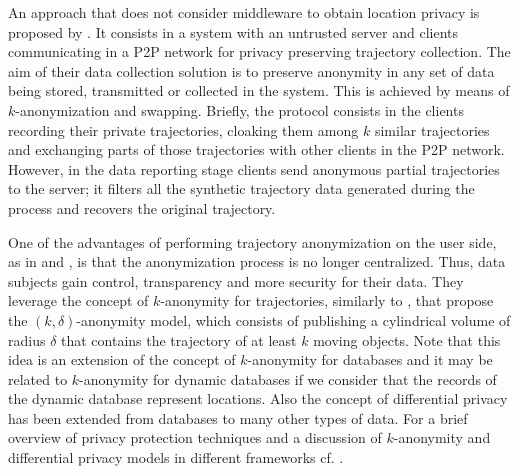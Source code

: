 \documentclass[times,twocolumn,final,authoryear]{elsarticle}
\begin{document}
An approach that does not consider middleware to obtain location privacy is proposed by \citet[Chapter 9]{Gidofalvi2007}. It consists in a system with an untrusted server and clients communicating in a P2P network for privacy preserving trajectory collection.
The aim of their data collection solution is to preserve anonymity in any set of data being stored, transmitted or
collected in the system. This is achieved by means of $k$-anonymization and swapping.
Briefly, the protocol consists in the clients recording their private trajectories, cloaking them among $k$ similar trajectories and exchanging parts of those trajectories with other clients in the P2P network. However, in the data reporting stage clients send anonymous partial trajectories to the server; it filters all the synthetic trajectory data generated during the process and recovers the original trajectory.

One of the advantages of performing trajectory anonymization on the user side, as in \cite{Romero-Tris2016} and \cite{Romero-Tris:2018}, is that the anonymization process is no longer centralized. Thus, data subjects gain control, transparency and more security for their data.
They leverage the concept of $k$-anonymity for trajectories, similarly to \cite{Abul2008}, that propose the $(k, \delta)$-anonymity model, which consists of publishing a cylindrical volume of radius $\delta$ that contains the trajectory of at least $k$ moving objects. 
Note that this idea is an extension of the concept of $k$-anonymity for databases \citep{Samarati:1998} and it may be related to $k$-anonymity for dynamic databases \citep{Salas:2018-b} if we consider that the records of the dynamic database represent locations.  
Also the concept of differential privacy \citep{Dwork:2006} has been extended from databases to many other types of data.
For a brief overview of privacy protection techniques and a discussion of $k$-anonymity and differential privacy models in different frameworks cf. \cite{Salas:2018}.
\end{document}
